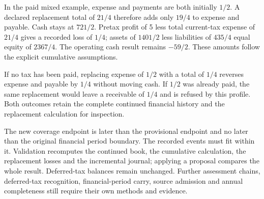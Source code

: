 In the paid mixed example, expense and payments are both initially $1/2$.
A declared replacement total of $21/4$ therefore adds only $19/4$ to expense
and payable. Cash stays at $721/2$. Pretax profit of 5 less total current-tax
expense of $21/4$ gives a recorded loss of $1/4$; assets of $1401/2$ less
liabilities of $435/4$ equal equity of $2367/4$. The operating cash result
remains $-59/2$. These amounts follow the explicit cumulative assumptions.

If no tax has been paid, replacing expense of $1/2$ with a total of $1/4$
reverses expense and payable by $1/4$ without moving cash. If $1/2$ was already
paid, the same replacement would leave a receivable of $1/4$ and is refused by
this profile. Both outcomes retain the complete continued financial history
and the replacement calculation for inspection.

The new coverage endpoint is later than the provisional endpoint and no later
than the original financial period boundary. The recorded events must fit
within it. Validation recomputes the continued book, the cumulative calculation,
the replacement losses and the incremental journal; applying a proposal compares
the whole result. Deferred-tax balances remain unchanged. Further assessment
chains, deferred-tax recognition, financial-period carry, source admission and
annual completeness still require their own methods and evidence.

